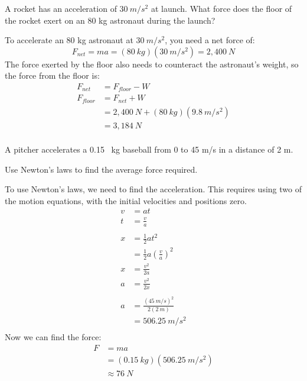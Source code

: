 \documentclass[fleqn,addpoints]{exam}
\begin{document}
\begin{questions}
\begin{parts}
\end{parts}

\question[5]
A rocket has an acceleration of $30 \ m/s^2$ at launch.  What force does the floor of the rocket exert on an 80 kg
astronaut during the launch?

\begin{solution}
To accelerate an 80 kg astronaut at $30 \ m/s^2$, you need a net force of:
\[
  F_{net} = ma = (80 \ kg)(30 \ m/s^2) = 2,400 \ N 
\]
The force exerted by the floor also needs to counteract the astronaut's weight, so the force from the floor is:
\begin{align*}
  F_{net}   &= F_{floor} - W \\
  F_{floor} &= F_{net} + W \\
           &= 2,400 \ N + (80 \ kg)(9.8 \ m/s^2) \\
           &= 3,184 \ N \\
\end{align*}

\end{solution}

\bonusquestion
A pitcher accelerates a 0.15 \ kg baseball from 0 to 45 m/s in a distance of 2 m.

\begin{parts}
\bonuspart[5]
Use Newton's laws to find the average force required.

\begin{solution}
To use Newton's laws, we need to find the acceleration.  This requires using two of the motion equations, with the
initial velocities and positions zero.
\begin{align*}
  v &= at \\
  t &= \frac{v}{a} \\
  \\
  x &= \frac{1}{2} at^2 \\
    &= \frac{1}{2} a \left( \frac{v}{a} \right)^2 \\
  x  &= \frac{v^2}{2a} \\
  a &= \frac{v^2}{2x} \\
  \\
  a &= \frac{(45 \ m/s)^2}{2 (2 \ m)} \\
    &= 506.25 \ m/s^2 \\
\end{align*}
Now we can find the force:
\begin{align*}
  F &= ma \\
    &= (0.15 \ kg)(506.25 \ m/s^2) \\
    &\approx 76 \ N
\end{align*}
\end{solution}


\end{parts}
\end{questions}
\end{document}
